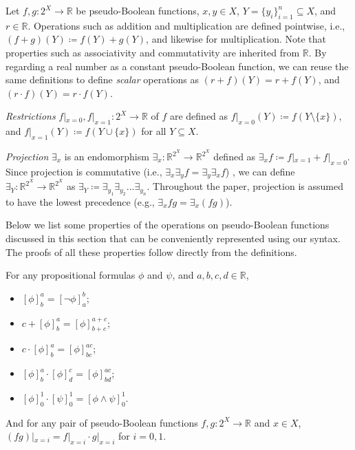 \begin{definition}[Operations] \label{def:operations}
  Let $f, g\colon 2^X \to \mathbb{R}$ be pseudo-Boolean functions, $x, y \in X$,
  $Y = \{y_i\}_{i=1}^n \subseteq X$, and $r \in \mathbb{R}$. Operations such as
  addition and multiplication are defined pointwise, i.e., $(f+g)(Y) \coloneqq
  f(Y)+g(Y)$, and likewise for multiplication. Note that properties such as
  associativity and commutativity are inherited from $\mathbb{R}$. By regarding
  a real number as a constant pseudo-Boolean function, we can reuse the same
  definitions to define \emph{scalar} operations as $(r+f)(Y) = r+f(Y)$, and $(r
  \cdot f)(Y) = r \cdot f(Y)$.

  \emph{Restrictions} $f|_{x=0}, f|_{x=1}\colon 2^X \to \mathbb{R}$ of $f$ are
  defined as $f|_{x=0}(Y) \coloneqq f(Y \setminus \{x\})$, and $f|_{x=1}(Y)
  \coloneqq f(Y \cup \{x\})$ for all $Y \subseteq X$.

  \emph{Projection} $\exists_x$ is an endomorphism $\exists_x\colon
  \mathbb{R}^{2^X} \to \mathbb{R}^{2^X}$ defined as $\exists_xf \coloneqq
  f|_{x=1} + f|_{x=0}$. Since projection is commutative (i.e.,
  $\exists_x\exists_yf = \exists_y\exists_xf$)
  \cite{DBLP:conf/aaai/DudekPV20,DBLP:conf/cp/DudekPV20}, we can define
  $\exists_Y\colon \mathbb{R}^{2^X} \to \mathbb{R}^{2^X}$ as $\exists_Y
  \coloneqq \exists_{y_1}\exists_{y_2}\dots\exists_{y_n}$. Throughout the paper,
  projection is assumed to have the lowest precedence (e.g., $\exists_x fg =
  \exists_x (fg)$).
\end{definition}

Below we list some properties of the operations on pseudo-Boolean functions
discussed in this section that can be conveniently represented using our syntax.
The proofs of all these properties follow directly from the definitions.

\begin{proposition} \label{prop:basic}
  For any propositional formulas $\phi$ and $\psi$, and $a, b, c, d \in
  \mathbb{R}$,
  \begin{itemize}
  \item $[\phi]^a_b = [\neg \phi]^b_a$;
  \item $c + [\phi]^a_b = [\phi]^{a+c}_{b+c}$;
  \item $c \cdot [\phi]^a_b = [\phi]^{ac}_{bc}$;
  \item $[\phi]^a_b \cdot [\phi]^c_d = [\phi]^{ac}_{bd}$;
  \item $[\phi]^1_0 \cdot [\psi]_0^1 = [\phi \land \psi]_0^1$.
  \end{itemize}
  And for any pair of pseudo-Boolean functions $f, g \colon 2^X \to \mathbb{R}$
  and $x \in  X$, $(fg)|_{x=i} = f|_{x=i} \cdot g|_{x=i}$ for $i = 0, 1$.
\end{proposition}

